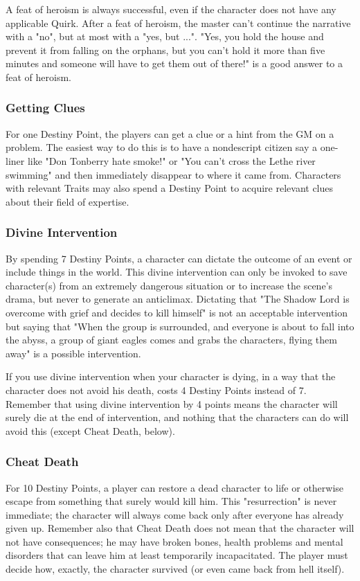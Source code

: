 \begin{multicols}{2}
A feat of heroism is always successful, even
if the character does not have any applicable Quirk.
After a feat of heroism, the master can’t continue
the narrative with a "no", but at most with a "yes,
but ...". "Yes, you hold the house and prevent it from
falling on the orphans, but you can’t hold it more
than five minutes and someone will have to get
them out of there!" is a good answer to a feat of
heroism.

\subsubsection{Getting Clues}
For one Destiny Point, the players can get a
clue or a hint from the GM on a problem. The
easiest way to do this is to have a nondescript
citizen say a one-liner like "Don Tonberry hate
smoke!" or "You can’t cross the Lethe river
swimming" and then immediately disappear to
where it came from. Characters with relevant
Traits may also spend a Destiny Point to acquire
relevant clues about their field of expertise.

\subsubsection{Divine Intervention}
By spending 7 Destiny Points, a character
can dictate the outcome of an event or include
things in the world. This divine intervention can
only be invoked to save character(s) from an
extremely dangerous situation or to increase the
scene’s drama, but never to generate an anticlimax.
Dictating that "The Shadow Lord is
overcome with grief and decides to kill himself" is
not an acceptable intervention but saying that
"When the group is surrounded, and everyone is
about to fall into the abyss, a group of giant eagles
comes and grabs the characters, flying them away"
is a possible intervention.

If you use divine intervention when your
character is dying, in a way that the character does
not avoid his death, costs 4 Destiny Points instead
of 7. Remember that using divine intervention by
4 points means the character will surely die at the
end of intervention, and nothing that the
characters can do will avoid this (except Cheat
Death, below).

\subsubsection{Cheat Death}
For 10 Destiny Points, a player can restore
a dead character to life or otherwise escape from
something that surely would kill him. This
"resurrection" is never immediate; the character
will always come back only after everyone has
already given up. Remember also that Cheat Death
does not mean that the character will not have
consequences; he may have broken bones, health
problems and mental disorders that can leave him
at least temporarily incapacitated. The player
must decide how, exactly, the character survived
(or even came back from hell itself).


\end{multicols}
